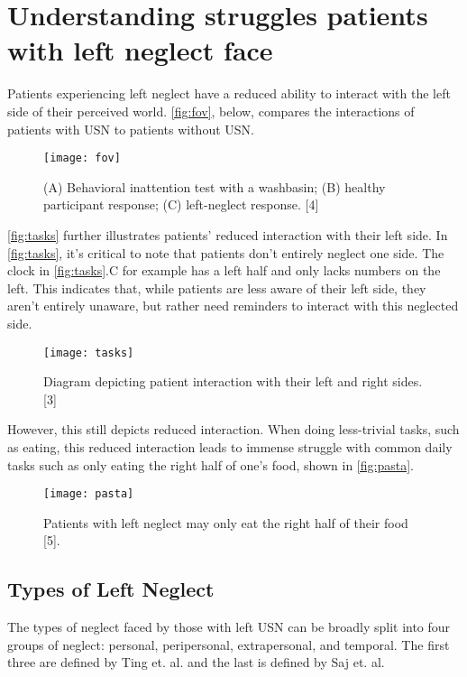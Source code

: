 \section{Understanding struggles patients with left neglect face}

Patients experiencing left neglect have a reduced ability to interact with the
left side of their perceived world. \autoref{fig:fov}, below, compares the
interactions of patients with USN to patients without USN. 

\begin{figure}[h]
  \centering
  \texttt{[image: fov]}
  \caption[Field of view comparison.]{(A) Behavioral inattention test with a
    washbasin; (B) healthy participant response; (C) left-neglect
    response. [4]}
  \label{fig:fov}
\end{figure}

\autoref{fig:tasks} further illustrates patients’ reduced interaction with
their left side. In \autoref{fig:tasks}, it’s critical to note that patients
don’t entirely neglect one side. The clock in \autoref{fig:tasks}.C for example
has a left half and only lacks numbers on the left. This indicates that, while
patients are less aware of their left side, they aren’t entirely unaware, but
rather need reminders to interact with this neglected side.

\begin{figure}[h]
  \centering
  \texttt{[image: tasks]}
  \caption{Diagram depicting patient interaction with their left and right
    sides. [3]}
  \label{fig:tasks}
\end{figure}

However, this still depicts reduced interaction. When doing less-trivial tasks,
such as eating, this reduced interaction leads to immense struggle with common
daily tasks such as only eating the right half of one’s food, shown in
\autoref{fig:pasta}.

\begin{figure}[h]
  \centering
  \texttt{[image: pasta]}
  \caption{Patients with left neglect may only eat the right half of their food
    [5].}
  \label{fig:pasta}
\end{figure}

\subsection{Types of Left Neglect}

The types of neglect faced by those with left USN can be broadly split into
four groups of neglect: personal, peripersonal, extrapersonal, and
temporal. The first three are defined by Ting et. al. and the last is defined
by Saj et. al. 


